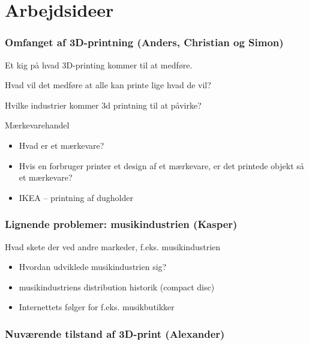 \chapter{Arbejdsideer} %
\label{cha:arbejdsideer}

\subsection{Omfanget af 3D-printning (Anders, Christian og Simon)} %
\label{sub:omfanget_af_3d_printning_anders_christian_og_simon_}

Et kig på hvad 3D-printing kommer til at medføre.

Hvad vil det medføre at alle kan printe lige hvad de vil?

Hvilke industrier kommer 3d printning til at påvirke?

Mærkevarehandel

\begin{itemize}
	\item Hvad er et mærkevare?
	\item Hvis en forbruger printer et design af et mærkevare, er det printede objekt så et mærkevare?
	\item IKEA – printning af dugholder
\end{itemize}


\subsection{Lignende problemer: musikindustrien (Kasper)} %
\label{sub:lignende_problemer_musikindustrien_kasper_}

Hvad skete der ved andre markeder, f.eks. musikindustrien

\begin{itemize}
	\item Hvordan udviklede musikindustrien sig?
	\item musikindustriens distribution historik (compact disc)
	\item Internettets følger for f.eks. musikbutikker
\end{itemize}

\subsection{Nuværende tilstand af 3D-print (Alexander)} %
\label{sub:nuv_rende_tilstand_af_3d_print_alexander_}

